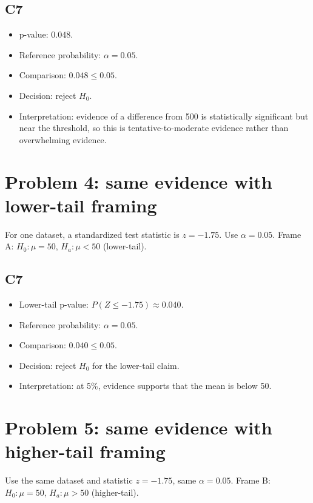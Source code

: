 \begin{ExamProblems}
\subsection*{C7}
\begin{itemize}
    \item p-value: \(0.048\).
    \item Reference probability: \(\alpha=0.05\).
    \item Comparison: \(0.048\le 0.05\).
    \item Decision: reject \(H_0\).
    \item Interpretation: evidence of a difference from 500 is statistically significant but near the threshold, so this is tentative-to-moderate evidence rather than overwhelming evidence.
\end{itemize}

\item
\section{Problem 4: same evidence with lower-tail framing}
For one dataset, a standardized test statistic is \(z=-1.75\).
Use \(\alpha=0.05\).
Frame A: \(H_0:\mu=50\), \(H_a:\mu<50\) (lower-tail).

\subsection*{C7}
\begin{itemize}
    \item Lower-tail p-value: \(P(Z\le -1.75)\approx 0.040\).
    \item Reference probability: \(\alpha=0.05\).
    \item Comparison: \(0.040\le 0.05\).
    \item Decision: reject \(H_0\) for the lower-tail claim.
    \item Interpretation: at 5\%, evidence supports that the mean is below 50.
\end{itemize}

\item
\section{Problem 5: same evidence with higher-tail framing}
Use the same dataset and statistic \(z=-1.75\), same \(\alpha=0.05\).
Frame B: \(H_0:\mu=50\), \(H_a:\mu>50\) (higher-tail).


\end{ExamProblems}
